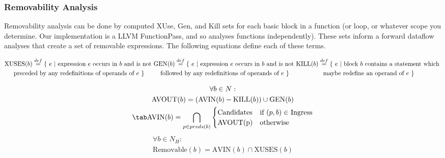 \documentclass[sigplan,screen]{acmart}
\begin{document}
    \subsubsection{Removability Analysis}

    Removability analysis can be done by computed XUse, Gen, and Kill sets for each basic block in a function (or loop, or whatever scope you determine. Our implementation is a LLVM FunctionPass, and so analyses functions independently). These sets inform a forward dataflow analyses that create a set of removable expressions. The following equations define each of these terms. 
    
    \begin{multline}
    \textrm{XUSES}(b) \overset{def}{=} \{\ e\ | \textrm{ expression } e \textrm{ occurs in } b \textrm{ and is not }\\ \textrm{preceded by any redefinitions of operands of } e\ \}
    \end{multline*}
    \begin{multline*}
    \textrm{GEN}(b) \overset{def}{=} \{\ e\ | \textrm{ expression } e \textrm{ occurs in } b \textrm{ and is not }\\ \textrm{followed by any redefinitions of operands of } e\ \}
    \end{multline*}    
    \begin{multline*}
    \textrm{KILL}(b) \overset{def}{=} \{\ e\ | \textrm{ block } b \textrm{ contains a statement which } \\ \textrm{maybe redefine an operand of } e\ \}
    \end{multline}
     
    \begin{multline}
    \forall b \in N:\\
        \textrm{AVOUT}(b) = (\textrm{AVIN}(b) - \textrm{KILL}(b)) \cup \textrm{GEN}(b)\\
        \tab\textrm{AVIN}(b) = \underset{p \in preds(b)}{\bigcap}
    \begin{cases}
      \text{Candidates} & \text{if $(p,b) \in $ Ingress}\\
      \text{AVOUT}($p$)& \text{otherwise}
    \end{cases}  
    \end{multline}
    \begin{multline}
    \forall b \in N_H:\\  
    \textrm{Removable}(b) = \textrm{AVIN}(b) \cap \textrm{XUSES}(b)
    \end{multline}
\end{document}
